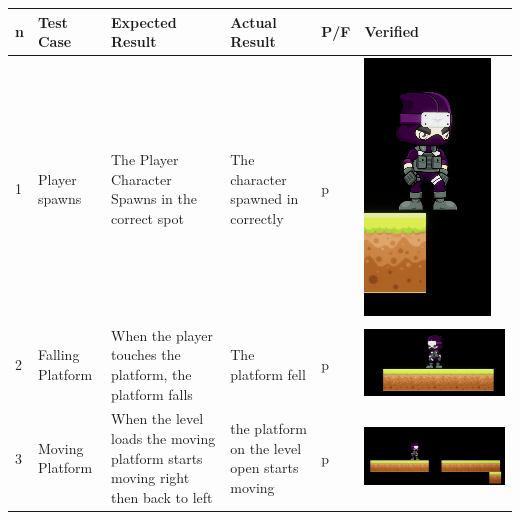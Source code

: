 \documentclass{article}
\begin{document}
\begin{center}		                               
	\begin{tabular}{|m{1em}|m{3em}|m{20em}|m{5em}|m{1.5em}|m{10em}|}
	\hline
		n & Test Case & Expected Result & Actual Result & P/F & Verified  \\
	\hline
	\hline
		1 & Player spawns & The Player Character Spawns in the correct spot & The character spawned in correctly & p & \includegraphics[scale=0.5]{Player spawns} \\
	\hline
		2 & Falling Platform & When the player touches the platform, the platform falls  & The platform fell & p & \includegraphics[scale=0.25]{Falling plat}\\
	\hline
		3 & Moving Platform & When the level loads the moving platform starts moving right then back to left  & the platform on the level open starts moving  & p & \includegraphics[scale=0.15]{Capture} \\

\end{tabular}
\end{center}
\end{document}

